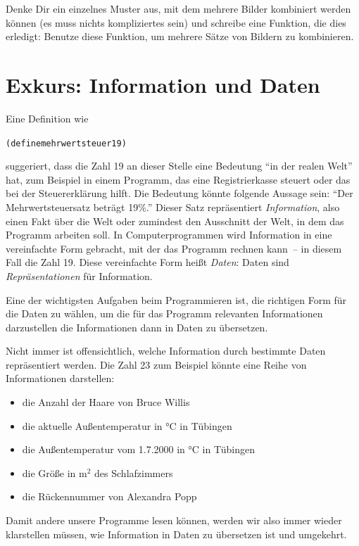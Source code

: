 \begin{aufgabe}
  Denke Dir ein einzelnes Muster aus, mit dem mehrere Bilder
  kombiniert werden können (es muss nichts kompliziertes sein) und
  schreibe eine Funktion, die dies erledigt: Benutze diese Funktion,
  um mehrere Sätze von Bildern zu kombinieren.
\end{aufgabe}

\section{Exkurs: Information und Daten}

Eine Definition wie
%
\begin{alltt}
(define mehrwertsteuer 19)
\end{alltt}
%
suggeriert, dass die Zahl 19 an dieser Stelle eine Bedeutung "`in der
realen Welt"' hat, zum Beispiel in einem Programm, das eine Registrierkasse
steuert oder das bei der Steuererklärung hilft.  Die Bedeutung könnte
folgende Aussage sein: "`Der Mehrwertsteuersatz beträgt 19\%."'
Dieser Satz repräsentiert \textit{Information},
also einen Fakt über die Welt oder zumindest den Ausschnitt der Welt, in
dem das Programm arbeiten soll.  In Computerprogrammen wird
Information in eine vereinfachte Form gebracht, mit der das Programm
rechnen kann~-- in diesem Fall die Zahl 19.  Diese vereinfachte Form
heißt \textit{Daten}: Daten sind
\textit{Repräsentationen} für Information.

Eine der wichtigsten Aufgaben beim Programmieren ist, die richtigen
Form für die Daten zu wählen, um die für das Programm relevanten
Informationen darzustellen die Informationen dann in Daten zu
übersetzen.

Nicht immer ist offensichtlich, welche Information durch bestimmte
Daten repräsentiert werden.  Die Zahl 23 zum Beispiel könnte eine Reihe
von Informationen darstellen:
%
\begin{itemize}
\item die Anzahl der Haare von Bruce Willis
\item die aktuelle Außentemperatur in °C in Tübingen
\item die Außentemperatur vom 1.7.2000 in °C in Tübingen
\item die Größe in m$^2$ des Schlafzimmers
\item die Rückennummer von Alexandra Popp
\end{itemize}
%
Damit andere unsere Programme lesen können, werden wir also immer
wieder klarstellen müssen, wie Information in Daten zu übersetzen ist
und umgekehrt.

